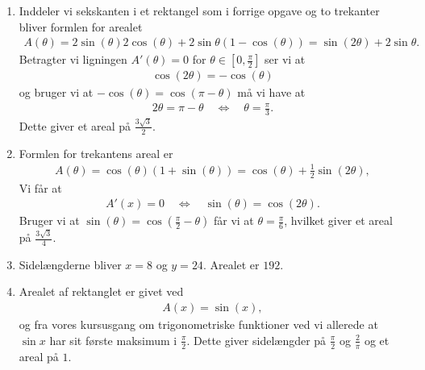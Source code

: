 \begin{enumerate}
	
	\item Inddeler vi sekskanten i et rektangel som i forrige opgave og to trekanter bliver formlen for arealet
	\begin{align*}
	A(\theta)=2\sin(\theta)2\cos(\theta)+2\sin\theta(1-\cos(\theta))=\sin(2\theta)+2\sin \theta.
	\end{align*}
	Betragter vi ligningen $A'(\theta)=0$ for $\theta\in [0,\frac{\pi}{2}]$ ser vi at
	\begin{align*}
	\cos(2\theta)=-\cos(\theta)
	\end{align*}
	og bruger vi at $-\cos(\theta)=\cos(\pi-\theta)$ må vi have at 
	\begin{align*}
	2\theta=\pi-\theta \quad\Leftrightarrow\quad \theta=\frac{\pi}{3}.
	\end{align*}
	Dette giver et areal på $\frac{3\sqrt{3}}{2}$.
	
	
	
	\item Formlen for trekantens areal er 
	\begin{align*}
	A(\theta)=\cos(\theta)(1+\sin(\theta))=\cos(\theta)+\frac{1}{2}\sin(2\theta),
	\end{align*}
	Vi får at
	\begin{align*}
	A'(x)=0\quad\Leftrightarrow\quad \sin(\theta)=\cos(2\theta).
	\end{align*}	
	Bruger vi at $\sin(\theta)=\cos(\frac{\pi}{2}-\theta)$ får vi at $\theta=\frac{\pi}{6}$, hvilket giver et areal på $\frac{3\sqrt{3}}{4} $.
	
	
	\item Sidelængderne bliver $x=8$ og $y=24$. Arealet er $192$. 
	
	\item Arealet af rektanglet er givet ved
	\begin{align*}
	A(x)=\sin(x),
	\end{align*}
	og fra vores kursusgang om trigonometriske funktioner ved vi allerede at $\sin x$ har sit første maksimum i $\frac{\pi}{2}$. Dette giver sidelængder på $\frac{\pi}{2}$ og $\frac{2}{\pi}$ og et areal på $1$.
	

\end{enumerate}
